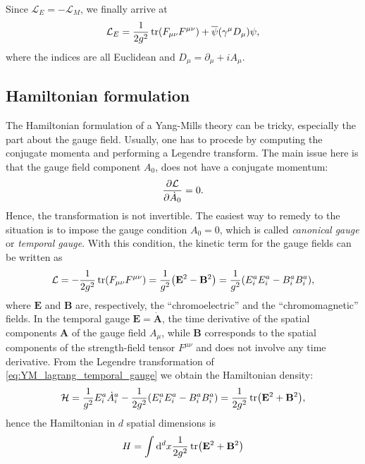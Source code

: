 Since $\mathcal{L}_E = - \mathcal{L}_M$, we finally arrive at
\begin{equation}
    \mathcal{L}_E
    = \frac{1}{2 g^2} \tr (F_{\mu \nu} F^{\mu \nu}) + \overline{\psi} \qty( \gamma^{\mu} D_{\mu} ) \psi,
\end{equation}
where the indices are all Euclidean and $D_{\mu} = \partial_{\mu} + i A_{\mu}$.



\subsection{Hamiltonian formulation}
\label{sub:hamiltonian_formulation}

The Hamiltonian formulation of a Yang-Mills theory can be tricky, especially the part about the gauge field.
Usually, one has to procede by computing the conjugate momenta and performing a Legendre transform.
The main issue here is that the gauge field component $A_0$, does not have a conjugate momentum:
\begin{equation}
    \pdv{\mathcal{L}}{\dot{A}_0} = 0.
\end{equation}
Hence, the transformation is not invertible.
The easiest way to remedy to the situation is to impose the gauge condition $A_0 = 0$,
which is called \emph{canonical gauge} or \emph{temporal gauge}.
With this condition, the kinetic term for the gauge fields can be written as
\begin{equation}
    \mathcal{L}
    = - \frac{1}{2 g^2} \tr(F_{\mu \nu} F^{\mu \nu})
    = \frac{1}{g^2} \qty( \mathbf{E}^2 - \mathbf{B}^2 )
    = \frac{1}{g^2} \qty(E^a_i E^a_i - B^a_i B^a_i),
    \label{eq:YM_lagrang_temporal_gauge}
\end{equation}
where $\mathbf{E}$ and $\mathbf{B}$ are, respectively, the ``chromoelectric'' and the ``chromomagnetic'' fields.
In the temporal gauge $\mathbf{E} = \dot{\mathbf{A}}$, the time derivative of the spatial components $\mathbf{A}$ of the gauge field $A_{\mu}$, while $\mathbf{B}$ corresponds to the spatial components of the strength-field tensor $F^{\mu \nu}$ and does not involve any time derivative.
From the Legendre transformation of \eqref{eq:YM_lagrang_temporal_gauge} we obtain the Hamiltonian density:
\begin{equation}
    \mathcal{H}
    = \frac{1}{g^2} E^a_i \dot{A}^a_i - \frac{1}{2 g^2} \qty( E^a_i E^a_i - B^a_i B^a_i )
    = \frac{1}{2g^2} \tr ( \mathbf{E}^2 + \mathbf{B}^2 ),
\end{equation}
hence the Hamiltonian in $d$ spatial dimensions is
\begin{equation}
    H = \int \dd^{d} x \frac{1}{2 g^2} \tr(\mathbf{E}^2 + \mathbf{B}^2)
\end{equation}

